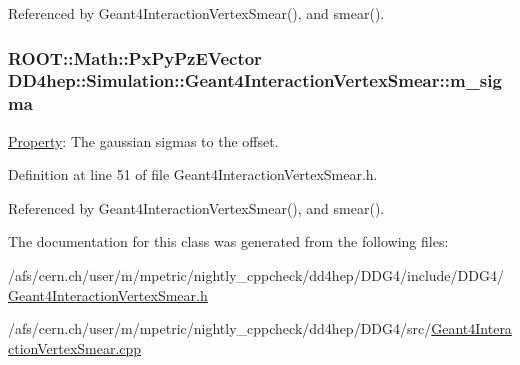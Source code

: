 Referenced by Geant4InteractionVertexSmear(), and smear().\hypertarget{class_d_d4hep_1_1_simulation_1_1_geant4_interaction_vertex_smear_a407c72b211c3733623129565bcc71e0c}{
\subsubsection[{m\_\-sigma}]{\setlength{\rightskip}{0pt plus 5cm}ROOT::Math::PxPyPzEVector {\bf DD4hep::Simulation::Geant4InteractionVertexSmear::m\_\-sigma}}}
\label{class_d_d4hep_1_1_simulation_1_1_geant4_interaction_vertex_smear_a407c72b211c3733623129565bcc71e0c}


\hyperlink{class_d_d4hep_1_1_property}{Property}: The gaussian sigmas to the offset. 

Definition at line 51 of file Geant4InteractionVertexSmear.h.

Referenced by Geant4InteractionVertexSmear(), and smear().

The documentation for this class was generated from the following files:\begin{DoxyCompactItemize}
\item 
/afs/cern.ch/user/m/mpetric/nightly\_\-cppcheck/dd4hep/DDG4/include/DDG4/\hyperlink{_geant4_interaction_vertex_smear_8h}{Geant4InteractionVertexSmear.h}\item 
/afs/cern.ch/user/m/mpetric/nightly\_\-cppcheck/dd4hep/DDG4/src/\hyperlink{_geant4_interaction_vertex_smear_8cpp}{Geant4InteractionVertexSmear.cpp}\end{DoxyCompactItemize}
